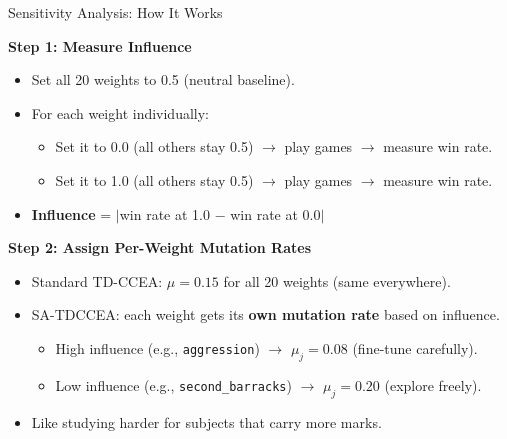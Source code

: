 \documentclass[aspectratio=169, 10pt]{beamer}
\begin{document}
\begin{frame}{Sensitivity Analysis: How It Works}

\textbf{\textcolor{amritaMaroon}{Step 1: Measure Influence}}
\begin{itemize}
    \item Set all 20 weights to 0.5 (neutral baseline).
    \item For each weight individually:
    \begin{itemize}
        \item Set it to 0.0 (all others stay 0.5) $\rightarrow$ play games $\rightarrow$ measure win rate.
        \item Set it to 1.0 (all others stay 0.5) $\rightarrow$ play games $\rightarrow$ measure win rate.
    \end{itemize}
    \item \textbf{Influence} = $|$win rate at 1.0 $-$ win rate at 0.0$|$
\end{itemize}

\vspace{0.3cm}
\textbf{\textcolor{amritaMaroon}{Step 2: Assign Per-Weight Mutation Rates}}
\begin{itemize}
    \item Standard TD-CCEA: $\mu = 0.15$ for all 20 weights (same everywhere).
    \item SA-TDCCEA: each weight gets its \textbf{own mutation rate} based on influence.
    \begin{itemize}
        \item High influence (e.g., \texttt{aggression}) $\rightarrow$ $\mu_j = 0.08$ (fine-tune carefully).
        \item Low influence (e.g., \texttt{second\_barracks}) $\rightarrow$ $\mu_j = 0.20$ (explore freely).
    \end{itemize}
    \item Like studying harder for subjects that carry more marks.
\end{itemize}

\end{frame}
\end{document}
